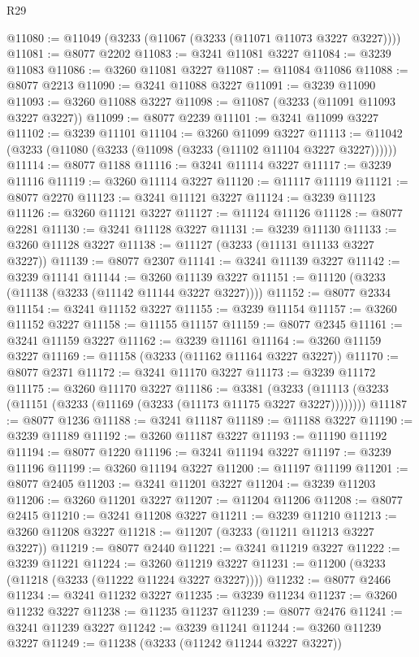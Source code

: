 \begin{lexlean}{R29}
\begin{coremodule}
@11080 := @11049 (@3233 (@11067 (@3233 (@11071 @11073 @3227 @3227))))
@11081 := @8077 @2202
@11083 := @3241 @11081 @3227
@11084 := @3239 @11083
@11086 := @3260 @11081 @3227
@11087 := @11084 @11086
@11088 := @8077 @2213
@11090 := @3241 @11088 @3227
@11091 := @3239 @11090
@11093 := @3260 @11088 @3227
@11098 := @11087 (@3233 (@11091 @11093 @3227 @3227))
@11099 := @8077 @2239
@11101 := @3241 @11099 @3227
@11102 := @3239 @11101
@11104 := @3260 @11099 @3227
@11113 := @11042 (@3233 (@11080 (@3233 (@11098 (@3233 (@11102 @11104 @3227 @3227))))))
@11114 := @8077 @1188
@11116 := @3241 @11114 @3227
@11117 := @3239 @11116
@11119 := @3260 @11114 @3227
@11120 := @11117 @11119
@11121 := @8077 @2270
@11123 := @3241 @11121 @3227
@11124 := @3239 @11123
@11126 := @3260 @11121 @3227
@11127 := @11124 @11126
@11128 := @8077 @2281
@11130 := @3241 @11128 @3227
@11131 := @3239 @11130
@11133 := @3260 @11128 @3227
@11138 := @11127 (@3233 (@11131 @11133 @3227 @3227))
@11139 := @8077 @2307
@11141 := @3241 @11139 @3227
@11142 := @3239 @11141
@11144 := @3260 @11139 @3227
@11151 := @11120 (@3233 (@11138 (@3233 (@11142 @11144 @3227 @3227))))
@11152 := @8077 @2334
@11154 := @3241 @11152 @3227
@11155 := @3239 @11154
@11157 := @3260 @11152 @3227
@11158 := @11155 @11157
@11159 := @8077 @2345
@11161 := @3241 @11159 @3227
@11162 := @3239 @11161
@11164 := @3260 @11159 @3227
@11169 := @11158 (@3233 (@11162 @11164 @3227 @3227))
@11170 := @8077 @2371
@11172 := @3241 @11170 @3227
@11173 := @3239 @11172
@11175 := @3260 @11170 @3227
@11186 := @3381
    (@3233 (@11113 (@3233 (@11151 (@3233 (@11169 (@3233 (@11173 @11175 @3227 @3227))))))))
@11187 := @8077 @1236
@11188 := @3241 @11187
@11189 := @11188 @3227
@11190 := @3239 @11189
@11192 := @3260 @11187 @3227
@11193 := @11190 @11192
@11194 := @8077 @1220
@11196 := @3241 @11194 @3227
@11197 := @3239 @11196
@11199 := @3260 @11194 @3227
@11200 := @11197 @11199
@11201 := @8077 @2405
@11203 := @3241 @11201 @3227
@11204 := @3239 @11203
@11206 := @3260 @11201 @3227
@11207 := @11204 @11206
@11208 := @8077 @2415
@11210 := @3241 @11208 @3227
@11211 := @3239 @11210
@11213 := @3260 @11208 @3227
@11218 := @11207 (@3233 (@11211 @11213 @3227 @3227))
@11219 := @8077 @2440
@11221 := @3241 @11219 @3227
@11222 := @3239 @11221
@11224 := @3260 @11219 @3227
@11231 := @11200 (@3233 (@11218 (@3233 (@11222 @11224 @3227 @3227))))
@11232 := @8077 @2466
@11234 := @3241 @11232 @3227
@11235 := @3239 @11234
@11237 := @3260 @11232 @3227
@11238 := @11235 @11237
@11239 := @8077 @2476
@11241 := @3241 @11239 @3227
@11242 := @3239 @11241
@11244 := @3260 @11239 @3227
@11249 := @11238 (@3233 (@11242 @11244 @3227 @3227))

\end{coremodule}
\end{lexlean}
